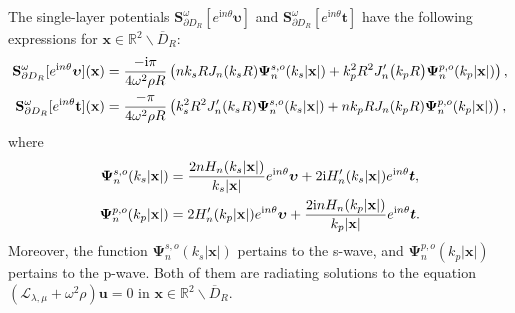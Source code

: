 \documentclass[10pt,a4paper]{amsart}
\newcommand{\bx}{\mathbf{x}}
\begin{document}
\begin{lem}
	The single-layer potentials $\mathbf{S}_{\partial D_{R}}^{\omega}[e^{\mathrm{i}n\theta}\bm{\upsilon}]$ and $\mathbf{S}_{\partial D_{R}}^{\omega}[e^{\mathrm{i}n\theta}\bm{t}]$ have the following expressions for $\bx\in\mathbb{R}^{2}\backslash\overline{D}_{R}$:
	\begin{align}\label{lem:qninutw}
		\mathbf{S}_{\partial D_{R}}^{\omega}[e^{\mathrm{i}n\theta}\bm{\upsilon }](\mathbf{x})&= \frac{-\mathrm{i}\pi}{4\omega^{2}\rho R}\left(nk_{s}RJ_{n}(k_{s}R)\bm{\Psi}_{n}^{s,o}(k_{s}|\mathbf{x}|)+k_{p}^{2}R^{2}J_{n}^{\prime}\big(k_{p}R\big)\bm{\Psi}_n^{p,o}(k_{p}|\mathbf{x}|)\right), \\
		\mathbf{S}_{\partial D_{R}}^{\omega}[e^{\mathrm{i}n\theta}\mathbf{t}](\mathbf{x})&= \frac{-\pi}{4\omega^{2}\rho R}\left(k_{s}^{2}R^{2}J_{n}^{\prime}(k_{s}R)\bm{\Psi}_{n}^{s,o}(k_{s}|\mathbf{x}|)+nk_{p}RJ_{n}(k_{p}R)\bm{\Psi}_n^{p,o}(k_{p}|\mathbf{x}|)\right), \notag
	\end{align}
	where
	\begin{align}
		\bm{\Psi}_{n}^{s,o}(k_{s}|\mathbf{x}|)&= \frac{2nH_{n}(k_{s}|\mathbf{x}|)}{k_{s}|\mathbf{x}|}e^{\mathrm{i}n\theta}\bm{\upsilon }+2\mathrm{i}H_{n}^{\prime}(k_{s}|\mathbf{x}|)e^{\mathrm{i}n\theta}\bm{t},\label{eq:qp0} \\
		\bm{\Psi}_n^{p,o}(k_p|\mathbf{x}|)&= 2H_{n}^{\prime}(k_{p}|\mathbf{x}|)e^{\mathrm{i}n\theta}\bm{\upsilon}+\frac{2\mathrm{i}nH_{n}(k_{p}|\mathbf{x}|)}{k_{p}|\mathbf{x}|}e^{\mathrm{i}n\theta}\bm{t}. \notag
	\end{align}
	Moreover, the function $\bm{\Psi}_{n}^{s,o}(k_{s}|\mathbf{x}|)$  pertains to the s-wave, and  $\bm{\Psi}_n^{p,o}\left(k_p|\mathbf{x}|\right)$ pertains to the p-wave. Both of them are radiating solutions to the equation $(\mathcal{L}_{\lambda,\mu}+\omega^{2}{\rho} )\mathbf{u}=0$ in $\bx\in\mathbb{R}^{2}\backslash\overline{D}_{R}$.
	

\end{lem}
\end{document}
